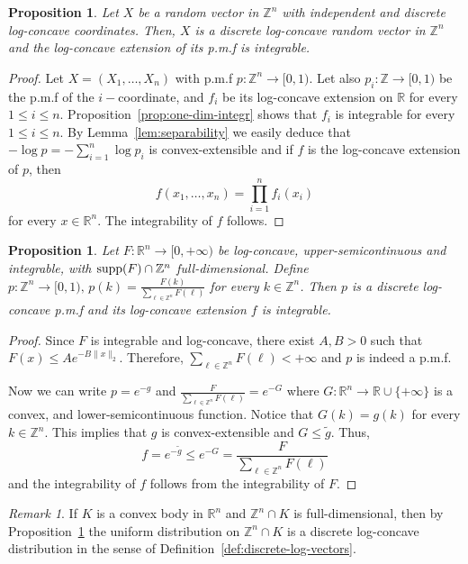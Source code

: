 \documentclass[11pt,a4paper]{article} %
\newtheorem{proposition}[theorem]{Proposition}
\theoremstyle{definition}
\theoremstyle{remark}
\newtheorem{remark}[theorem]{Remark}
\newcommand{\1}{\mathds{1}}
\begin{document}
\begin{proposition}
    Let $X$ be a random vector in $\mathbb{Z}^n$ with independent and discrete log-concave coordinates. Then, $X$ is a discrete log-concave random vector in $\mathbb{Z}^n$ and the log-concave extension of its p.m.f is integrable.
\end{proposition}

\begin{proof}
    Let $X=(X_1,\ldots,X_n)$ with p.m.f $p :\mathbb{Z}^n \to [0,1)$. Let also $p_i : \mathbb{Z} \to [0,1)$ be the p.m.f of the $i-$coordinate, and $f_i$ be its log-concave extension on $\mathbb{R}$ for every $1 \leq i \leq n$. Proposition~\ref{prop:one-dim-integr} shows that $f_i$ is integrable for every $1 \leq i \leq n$. By Lemma~\ref{lem:separability} we easily deduce that $-\log p=-\sum\limits_{i=1}^n \log p_i$ is convex-extensible and if $f$ is the log-concave extension of $p$, then $$f(x_1,\ldots,x_n)= \prod_{i=1}^{n} f_i(x_i)$$ for every $x \in \mathbb{R}^n$. The integrability of $f$ follows.
\end{proof}

\begin{proposition}\label{prop:restiction-log-concave}
    Let $F: \mathbb{R}^n \to [0,+\infty)$ be log-concave, upper-semicontinuous and integrable, with ${\rm supp}(F) \cap \mathbb{Z}^n$ full-dimensional. Define $p: \mathbb{Z}^n \to [0,1), \, p(k)=\frac{F(k)}{\sum_{\ell \in \mathbb{Z}^n}F(\ell)}$ for every $k \in \mathbb{Z}^n$. Then $p$ is a discrete log-concave p.m.f and its log-concave extension $f$ is integrable. 
\end{proposition}

\begin{proof} Since $F$ is integrable and log-concave, there exist $A,B>0$ such that $F(x) \leq Ae^{-B\|x\|_2}$. Therefore, $\sum_{\ell \in \mathbb{Z}^n}F(\ell)<+\infty$ and $p$ is indeed a p.m.f.

Now we can write $p=e^{-g}$ and  $\frac{F}{\sum_{\ell \in \mathbb{Z}^n}F(\ell)}=e^{-G}$ where $G:\mathbb{R}^n \to \mathbb{R} \cup \{+\infty\}$ is a convex, and lower-semicontinuous function. Notice that  $G(k)=g(k)$ for every $k \in \mathbb{Z}^n$. This implies that $g$ is convex-extensible and $G \leq \tilde{g}$. Thus, $$f=e^{-\tilde{g}} \leq e^{-G}=\frac{F}{\sum_{\ell \in \mathbb{Z}^n}F(\ell)}$$ and the integrability of $f$ follows from the integrability of $F$.
\end{proof}

\begin{remark}
    If $K$ is a convex body in $\mathbb{R}^n$ and $\mathbb{Z}^n \cap K$ is full-dimensional, then by Proposition~\ref{prop:restiction-log-concave} the uniform distribution on $\mathbb{Z}^n \cap K$ is a discrete log-concave distribution in the sense of Definition~\ref{def:discrete-log-vectors}.
\end{remark}
\end{document}
